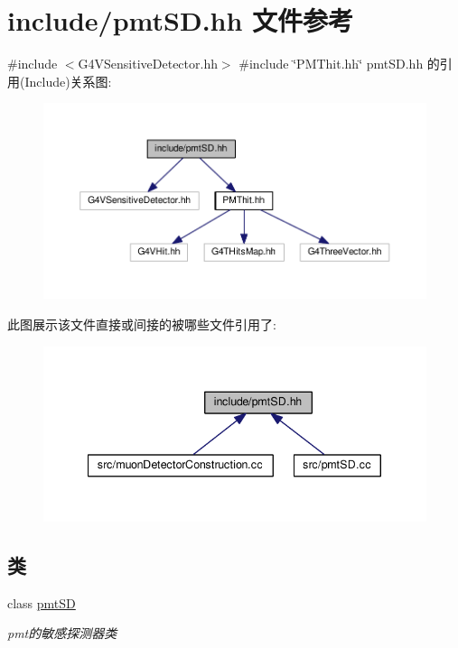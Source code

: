 \hypertarget{pmtSD_8hh}{}\section{include/pmt\+SD.hh 文件参考}
\label{pmtSD_8hh}
{\ttfamily \#include $<$G4\+V\+Sensitive\+Detector.\+hh$>$}\newline
{\ttfamily \#include \char`\"{}P\+M\+Thit.\+hh\char`\"{}}\newline
pmt\+S\+D.\+hh 的引用(Include)关系图\+:\nopagebreak
\begin{figure}[H]
\begin{center}
\leavevmode
\includegraphics[width=350pt]{pmtSD_8hh__incl}
\end{center}
\end{figure}
此图展示该文件直接或间接的被哪些文件引用了\+:\nopagebreak
\begin{figure}[H]
\begin{center}
\leavevmode
\includegraphics[width=340pt]{pmtSD_8hh__dep__incl}
\end{center}
\end{figure}
\subsection*{类}
\begin{DoxyCompactItemize}
\item 
class \hyperlink{classpmtSD}{pmt\+SD}
\begin{DoxyCompactList}\small\item\em pmt的敏感探测器类 \end{DoxyCompactList}\end{DoxyCompactItemize}
